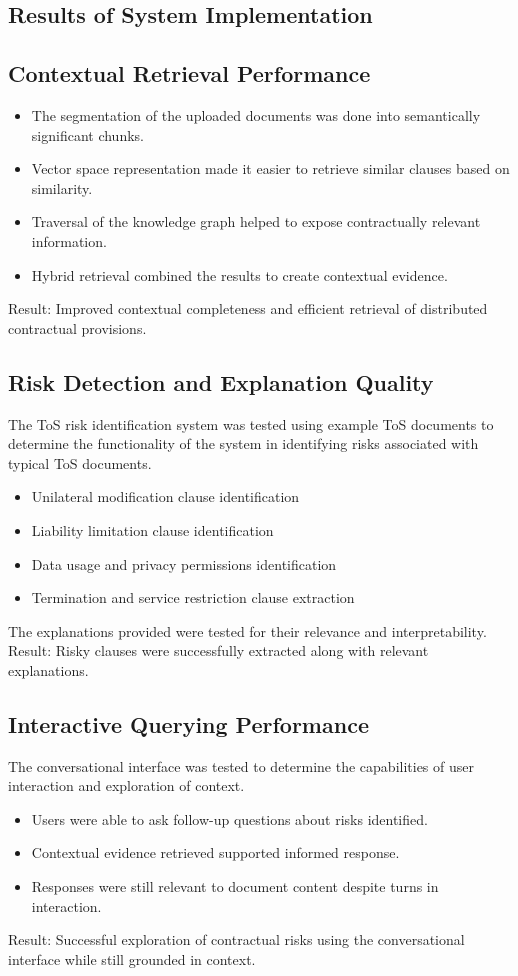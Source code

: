 \subsection{Results of System Implementation}

\subsection*{Contextual Retrieval Performance}
\begin{itemize}
  \item The segmentation of the uploaded documents was done into
    semantically significant chunks.
  \item Vector space representation made it easier to retrieve
    similar clauses based on similarity.
  \item Traversal of the knowledge graph helped to expose
    contractually relevant information.
  \item Hybrid retrieval combined the results to create contextual evidence.
\end{itemize}
Result: Improved contextual completeness and efficient retrieval of
distributed contractual provisions.

\subsection*{Risk Detection and Explanation Quality}
The ToS risk identification system was tested using example ToS
documents to determine the functionality of the system in identifying
risks associated with typical ToS documents.
\begin{itemize}
  \item Unilateral modification clause identification
  \item Liability limitation clause identification
  \item Data usage and privacy permissions identification
  \item Termination and service restriction clause extraction
\end{itemize}
The explanations provided were tested for their relevance and interpretability.
Result: Risky clauses were successfully extracted along with relevant
explanations.

\subsection*{Interactive Querying Performance}
The conversational interface was tested to determine the capabilities
of user interaction and exploration of context.
\begin{itemize}
  \item Users were able to ask follow-up questions about risks identified.
  \item Contextual evidence retrieved supported informed response.
  \item Responses were still relevant to document content despite turns in
    interaction.
\end{itemize}
Result: Successful exploration of contractual risks using the
conversational interface while still grounded in context.

